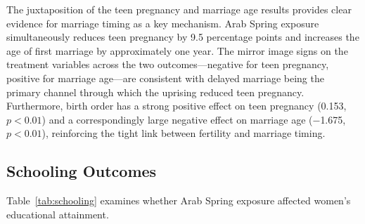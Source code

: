 \documentclass[12pt,a4paper]{article}
\begin{document}
\noindent The juxtaposition of the teen pregnancy and marriage age results provides clear evidence for marriage timing as a key mechanism. Arab Spring exposure simultaneously reduces teen pregnancy by 9.5 percentage points and increases the age of first marriage by approximately one year. The mirror image signs on the treatment variables across the two outcomes---negative for teen pregnancy, positive for marriage age---are consistent with delayed marriage being the primary channel through which the uprising reduced teen pregnancy. Furthermore, birth order has a strong positive effect on teen pregnancy (0.153, $p<0.01$) and a correspondingly large negative effect on marriage age ($-$1.675, $p<0.01$), reinforcing the tight link between fertility and marriage timing.
\vspace{0.25cm}

\subsection{Schooling Outcomes}

Table~\ref{tab:schooling} examines whether Arab Spring exposure affected women's educational attainment.
\vspace{0.25cm}
\end{document}
